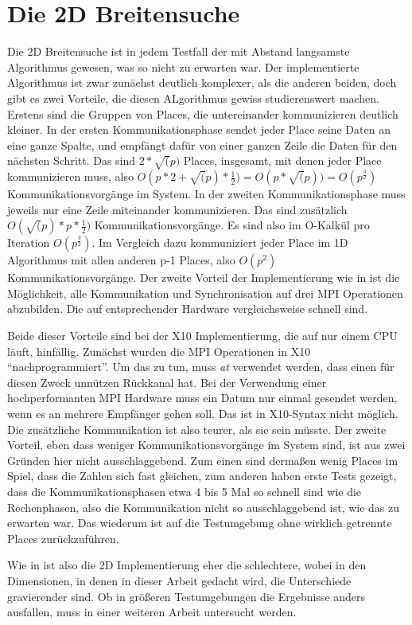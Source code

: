 \section{Die 2D Breitensuche} %
\label{sec:die_2d_breitensuche}
Die 2D Breitensuche ist in jedem Testfall der mit Abstand langsamste Algorithmus gewesen, was so nicht zu erwarten war. Der implementierte Algorithmus ist zwar zunächst deutlich komplexer, als die anderen beiden, doch gibt es zwei Vorteile, die diesen ALgorithmus gewiss studierenswert machen. Erstens sind die Gruppen von Places, die untereinander kommunizieren deutlich kleiner. In der ersten Kommunikationsphase sendet jeder Place seine Daten an eine ganze Spalte, und empfängt dafür von einer ganzen Zeile die Daten für den nächsten Schritt. Das sind $2 * \sqrt(p)$ Places, insgesamt, mit denen jeder Place kommunizieren muss, also $O(p * 2 + \sqrt(p) * \frac{1}{2}) = O(p * \sqrt(p))= O(p^{\frac{3}{2}})$ Kommunikationsvorgänge im System. In der zweiten Kommunikationsphase muss jeweils nur eine Zeile miteinander kommunizieren. Das sind zusätzlich $O(\sqrt(p) * p * \frac{1}{2})$ Kommunikationsvorgänge. Es sind also im O-Kalkül pro Iteration $O(p^{\frac{3}{2}})$. Im Vergleich dazu kommuniziert jeder Place im 1D Algorithmus mit allen anderen p-1 Places, also $O(p^2)$ Kommunikationsvorgänge. Der zweite Vorteil der Implementierung wie in \cite{Buluc:2011} ist die Möglichkeit, alle Kommunikation und Synchronisation auf drei MPI Operationen abzubilden. Die auf entsprechender Hardware vergleichsweise schnell sind. 

Beide dieser Vorteile sind bei der X10 Implementierung, die auf nur einem CPU läuft, hinfällig. Zunächst wurden die MPI Operationen in X10 \enquote{nachprogrammiert}. Um das zu tun, muss \textit{at} verwendet werden, dass einen für diesen Zweck unnützen Rückkanal hat. Bei der Verwendung einer hochperformanten MPI Hardware muss ein Datum nur einmal gesendet werden, wenn es an mehrere Empfänger gehen soll. Das ist in X10-Syntax nicht möglich. Die zusätzliche Kommunikation ist also teurer, als sie sein müsste. 
Der zweite Vorteil, eben dass weniger Kommunikationsvorgänge im System sind, ist aus zwei Gründen hier nicht ausschlaggebend. Zum einen sind dermaßen wenig Places im Spiel, dass die Zahlen sich fast gleichen, zum anderen haben erste Tests gezeigt, dass die Kommunikationsphasen etwa 4 bis 5 Mal so schnell sind wie die Rechenphasen, also die Kommunikation nicht so ausschlaggebend ist, wie das zu erwarten war. Das wiederum ist auf die Testumgebung ohne wirklich getrennte Places zurückzuführen.

Wie in \cite{Buluc:2011} ist also die 2D Implementierung eher die schlechtere, wobei in den Dimensionen, in denen in dieser Arbeit gedacht wird,  die Unterschiede gravierender sind. Ob in  größeren Testumgebungen die Ergebnisse anders ausfallen, muss in einer weiteren Arbeit untersucht werden.
